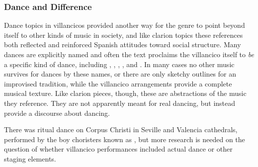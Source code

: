 
\subsubsection{Dance and Difference}

Dance topics in villancicos provided another way for the genre to point beyond
itself to other kinds of music in society, and like clarion topics these
references both reflected and reinforced Spanish attitudes toward social
structure.
Many dances are explicitly named and often the text proclaims the villancico
itself to \emph{be} a specific kind of dance, including ,
, , , and
.
In many cases no other music survives for dances by these names, or there are
only sketchy outlines for an improvised tradition, while the villancico
arrangements provide a complete musical texture.%
    \Autocites[For example,][]{Ruiz:Luz}
    [inventively reconstructed,][]{Lawrence-King:DancesCD}
Like clarion pieces, though, these are abstractions of the music they
reference.
They are not apparently meant for real dancing, but instead provide a discourse
about dancing.%
\begin{Footnote}
    There was ritual dance on Corpus Christi in Seville and Valencia
    cathedrals, performed by the boy choristers known as , but
    more research is needed on the question of whether villancico performances
    included actual dance or other staging elements.%
    \Autocite{Comes:Danzas}
\end{Footnote}


